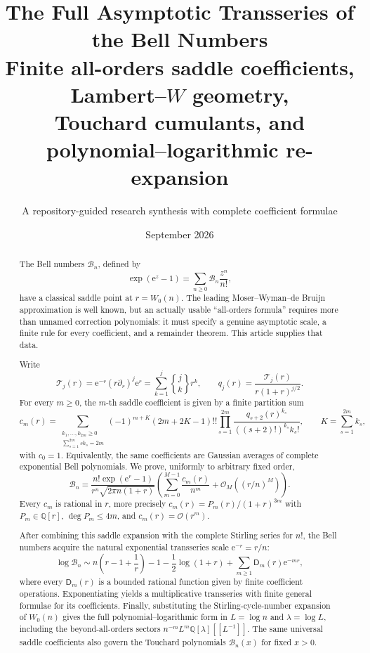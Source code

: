 \documentclass[11pt,a4paper]{article}
\title{\Huge\bfseries The Full Asymptotic Transseries of the Bell Numbers\\[3mm]
\Large Finite all-orders saddle coefficients, Lambert--\(W\) geometry,\\
Touchard cumulants, and polynomial--logarithmic re-expansion}
\author{A repository-guided research synthesis with complete coefficient formulae}
\date{September 2026}
\theoremstyle{definition}
\theoremstyle{remark}
\newcommand{\Bell}{\mathcal B}
\newcommand{\Tch}{\mathscr T}
\newcommand{\Q}{\mathbb Q}
\newcommand{\ee}{\mathrm e}
\newcommand{\BigO}{\mathcal O}
\newcommand{\Stwo}[2]{\genfrac\{\}{0pt}{}{#1}{#2}}
\newcommand{\cD}{\mathsf D}
\begin{document}
\maketitle

\begin{abstract}
The Bell numbers \(\Bell_n\), defined by
\[
  \exp(\ee^z-1)=\sum_{n\ge 0}\Bell_n\frac{z^n}{n!},
\]
have a classical saddle point at \(r=W_0(n)\).  The leading Moser--Wyman--de
Bruijn approximation is well known, but an actually usable ``all-orders formula''
requires more than unnamed correction polynomials: it must specify a genuine
asymptotic scale, a finite rule for every coefficient, and a remainder theorem.
This article supplies that data.

Write
\[
 \Tch_j(r)=\ee^{-r}(r\partial_r)^j\ee^r
          =\sum_{k=1}^j\Stwo{j}{k}r^k,
 \qquad
 q_j(r)=\frac{\Tch_j(r)}{r(1+r)^{j/2}}.
\]
For every \(m\ge 0\), the \(m\)-th saddle coefficient is given by a finite
partition sum
\[
 c_m(r)=
 \sum_{\substack{k_1,\ldots,k_{2m}\ge0\\
                   \sum_{s=1}^{2m}s k_s=2m}}
 (-1)^{m+K}(2m+2K-1)!!
 \prod_{s=1}^{2m}
 \frac{q_{s+2}(r)^{k_s}}{((s+2)!)^{k_s}k_s!},
 \qquad K=\sum_{s=1}^{2m}k_s,
\]
with \(c_0=1\).  Equivalently, the same coefficients are Gaussian averages of
complete exponential Bell polynomials.  We prove, uniformly to arbitrary fixed
order,
\[
 \Bell_n=
 \frac{n!\exp(\ee^r-1)}{r^n\sqrt{2\pi n(1+r)}}
 \left(\sum_{m=0}^{M-1}\frac{c_m(r)}{n^m}
       +\BigO_M\!\left((r/n)^M\right)\right).
\]
Every \(c_m\) is rational in \(r\), more precisely
\(c_m(r)=P_m(r)/(1+r)^{3m}\) with \(P_m\in\Q[r]\),
\(\deg P_m\le 4m\), and \(c_m(r)=\BigO(r^m)\).

After combining this saddle expansion with the complete Stirling series for
\(n!\), the Bell numbers acquire the natural exponential transseries scale
\(\ee^{-r}=r/n\):
\[
 \log \Bell_n
 \sim n\left(r-1+\frac1r\right)-1-\frac12\log(1+r)
       +\sum_{m\ge1}\cD_m(r)\ee^{-mr},
\]
where every \(\cD_m(r)\) is a bounded rational function given by finite
coefficient operations.  Exponentiating yields a multiplicative transseries with
finite general formulae for its coefficients.  Finally, substituting the
Stirling-cycle-number expansion of \(W_0(n)\) gives the full
polynomial--logarithmic form in \(L=\log n\) and \(\lambda=\log L\), including
the beyond-all-orders sectors \(n^{-m}L^m\Q[\lambda][[L^{-1}]]\).  The same
universal saddle coefficients also govern the Touchard polynomials
\(\Bell_n(x)\) for fixed \(x>0\).
\end{abstract}
\end{document}
